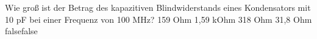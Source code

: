     {Wie groß ist der Betrag des kapazitiven Blindwiderstands eines Kondensators mit 10 pF bei einer Frequenz von 100 MHz?}
    {159 Ohm}
    {1,59 kOhm}
    {318 Ohm}
    {31,8 Ohm}
    {false}{false}